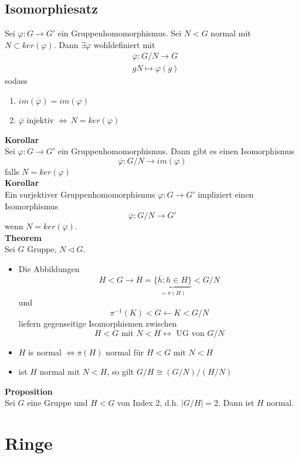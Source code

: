 \documentclass[a4paper, 12pt]{article}
\begin{document}
\subsection{Isomorphiesatz}
Sei $\varphi: G\to G'$ ein Gruppenhomomorphismus. Sei $N<G$ normal mit $N\subset ker(\varphi)$. Dann $\exists \overline{\varphi}$ wohldefiniert mit \begin{eqnarray*}
	& \overline{\varphi}: G/N \to G\\
	& gN \mapsto \varphi(g)
\end{eqnarray*}
sodass \begin{enumerate}
	\item $im(\overline{\varphi}) = im(\varphi)$
	\item $\overline{\varphi}$ injektiv $\Leftrightarrow \, N = ker(\varphi)$
\end{enumerate}
\textbf{Korollar}\\
Sei $\varphi: G\to G'$ ein Gruppenhomomorphismus. Dann gibt es einen Isomorphismus \[\overline{\varphi}: G/N \to im(\varphi)\] falls $N = ker(\varphi)$\\
\textbf{Korollar}\\
Ein surjektiver Gruppenhomomorphismus $\varphi: G \to G'$ impliziert einen Isomorphismus \[\overline{\varphi}: G/N \to G'\] wenn $N = ker(\varphi)$.\\
\textbf{Theorem}\\
Sei $G$ Gruppe, $N\triangleleft G$. \begin{itemize}
	\item Die Abbildungen \[H<G \to \overline{H} = \underbrace{\{\overline{h}: h \in H\}}_{=\pi(H)} < G/N\] und \[\pi^{-1}(K)<G \leftarrow K<G/N\] liefern gegenseitige Isomorphismen zwischen \[H<G \text{ mit } N<H \leftrightarrow \text{ UG von } G/N\]
	\item $H$ is normal $\Leftrightarrow \pi(H)$ normal für $H<G$ mit $N<H$
	\item ist $H$ normal mit $N<H$, so gilt $G/H \cong (G/N)/(H/N)$
\end{itemize}
\textbf{Proposition}\\
Sei $G$ eine Gruppe und $H<G$ von Index 2, d.h. $\left|G/H\right| = 2$. Dann ist $H$ normal.
\section{Ringe}
\end{document}
